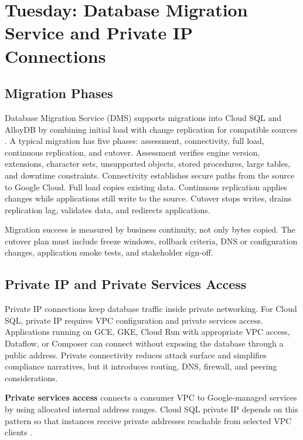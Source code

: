 \section{Tuesday: Database Migration Service and Private IP Connections}

\subsection{Migration Phases}
Database Migration Service (DMS) supports migrations into Cloud SQL and AlloyDB by combining initial load with change replication for compatible sources \cite{googleclouddmsdocs}. A typical migration has five phases: assessment, connectivity, full load, continuous replication, and cutover. Assessment verifies engine version, extensions, character sets, unsupported objects, stored procedures, large tables, and downtime constraints. Connectivity establishes secure paths from the source to Google Cloud. Full load copies existing data. Continuous replication applies changes while applications still write to the source. Cutover stops writes, drains replication lag, validates data, and redirects applications.

\begin{notebox}
Migration success is measured by business continuity, not only bytes copied. The cutover plan must include freeze windows, rollback criteria, DNS or configuration changes, application smoke tests, and stakeholder sign-off.
\end{notebox}

\subsection{Private IP and Private Services Access}
Private IP connections keep database traffic inside private networking. For Cloud SQL, private IP requires VPC configuration and private services access. Applications running on GCE, GKE, Cloud Run with appropriate VPC access, Dataflow, or Composer can connect without exposing the database through a public address. Private connectivity reduces attack surface and simplifies compliance narratives, but it introduces routing, DNS, firewall, and peering considerations.

\begin{definitionbox}
\textbf{Private services access} connects a consumer VPC to Google-managed services by using allocated internal address ranges. Cloud SQL private IP depends on this pattern so that instances receive private addresses reachable from selected VPC clients \cite{googlecloudsqlprivateip}.
\end{definitionbox}

